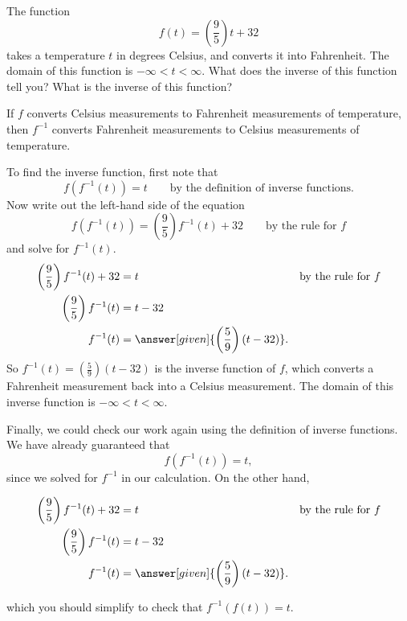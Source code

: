 \documentclass{ximera}
\begin{document}
\begin{example}
  The function
  \[
  f(t) = \left(\frac{9}{5}\right) t + 32
  \]	
  takes a temperature $t$ in degrees Celsius, and converts it into Fahrenheit.  
  The domain of this function is $-\infty < t < \infty$.  What does the inverse 
  of this function tell you? What is the inverse of this function?

  \begin{explanation}
    If $f$ converts Celsius measurements to Fahrenheit measurements of
    temperature, then $f^{-1}$ converts Fahrenheit measurements to
    Celsius measurements of temperature.
    
    To find the inverse function, first note that 
    \[
    f(f^{-1}(t)) = t \qquad \text{by the definition of inverse
      functions.}
    \]
    Now write out the left-hand side of the equation
    \[
    f(f^{-1}(t)) = \left(\frac{9}{5}\right) f^{-1}(t)+32\qquad\text{by the rule for $f$}
    \]
    and solve for $f^{-1}(t)$.
    \begin{align*}
      \left(\frac{9}{5}\right) f^{-1}(t)+32 &= t &&\text{by the rule for $f$}\\
      \left(\frac{9}{5}\right) f^{-1}(t)&= t -32\\
      f^{-1}(t) &= \answer[given]{\left(\frac{5}{9}\right)(t - 32)}.
    \end{align*}
    So $f^{-1}(t) = \left(\frac{5}{9}\right)(t - 32)$ is the inverse
    function of $f$, which converts a Fahrenheit measurement back into
    a Celsius measurement.  The domain of this inverse function is $-\infty < t <\infty$.
    
    Finally, we could check our work again using the definition of inverse functions.
     We have already guaranteed that
    \[
    f(f^{-1}(t)) = t,
    \]
    since we solved for $f^{-1}$ in our calculation.  On the other hand, 
  
    \begin{align*}
      \left(\frac{9}{5}\right) f^{-1}(t)+32 &= t &&\text{by the rule for $f$}\\
      \left(\frac{9}{5}\right) f^{-1}(t)&= t -32\\
      f^{-1}(t) &= \answer[given]{\left(\frac{5}{9}\right)(t - 32)}.
    \end{align*}
    
 
    which you should simplify to check that $f^{-1}(f(t)) = t$.
  \end{explanation}
\end{example}
\end{document}
